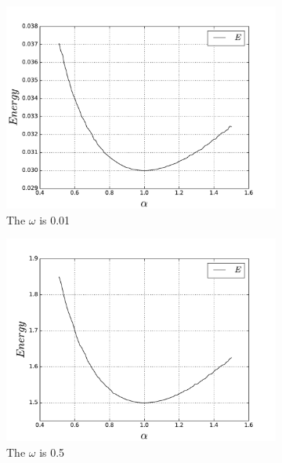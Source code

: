 \documentclass[10pt]{article}
\begin{document}
\begin{figure}[h!] 
  \begin{subfigure}[b]{0.55\linewidth}
    \centering
    \includegraphics[width=0.9\linewidth]{energy_on_alpha_001} 
    \caption{The $\omega$ is 0.01} 
    \label{fig1:a} 
    \vspace{1ex}
  \end{subfigure}%
  \begin{subfigure}[b]{0.55\linewidth}
    \centering
    \includegraphics[width=0.9\linewidth]{energy_on_alpha_05} 
    \caption{The $\omega$ is 0.5} 
    \label{fig1:b} 
    \vspace{1ex}
  \end{subfigure} 
  \begin{subfigure}[b]{0.55\linewidth}
    \centering

\end{subfigure}
\end{figure}
\end{document}
